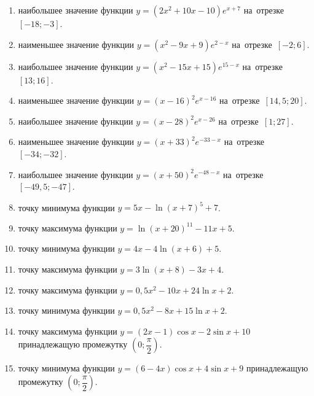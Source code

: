 \documentclass[a4paper,10pt]{article}
\begin{document}
\begin{enumerate}
\item {} наибольшее значение функции $y=\left(2x^2 +10x -10\right)e^{x+7}$ на~отрезке~$\left[-18;-3\right]$.

\item {} наименьшее значение функции $y=\left(x^2 -9x +9\right)e^{2-x}$ на~отрезке~$\left[-2;6\right]$.

\item {} наибольшее значение функции $y=\left(x^2 -15x +15\right)e^{15-x}$ на~отрезке~$\left[13;16\right]$.

\item {} наименьшее значение функции $y=\left(x-16\right)^2e^{x-16}$ на~отрезке~$\left[14,5;20\right]$.

\item {} наибольшее значение функции $y=\left(x-28\right)^2e^{x-26}$ на~отрезке~$\left[1;27\right]$.

\item {} наименьшее значение функции $y=\left(x+33\right)^2e^{-33-x}$ на~отрезке~$\left[-34;-32\right]$.

\item {} наибольшее значение функции $y=\left(x+50\right)^2e^{-48-x}$ на~отрезке~$\left[-49,5;-47\right]$.

\item {} точку минимума функции $y=5x-\ln\left(x+7\right)^{5}+7$.

\item {} точку максимума функции $y=\ln\left(x+20\right)^{11}-11x+5$.

\item {} точку минимума функции $y=4x-4\ln\left(x+6\right)+5$.

\item {} точку максимума функции $y=3\ln\left(x+8\right)-3x+4$.

\item {} точку максимума функции $y=0,5x^2-10x+24\ln x +2$.

\item {} точку минимума функции $y=0,5x^2-8x+15\ln x +2$.

\item {} точку максимума функции $y=\left(2x-1\right)\cos x -2\sin x+10$
принадлежащую промежутку $\left(0;\dfrac{\pi}{2}\right)$.

\item {} точку минимума функции $y=\left(6-4x\right)\cos x +4\sin x+9$
принадлежащую промежутку $\left(0;\dfrac{\pi}{2}\right)$.


\end{enumerate}
\end{document}
